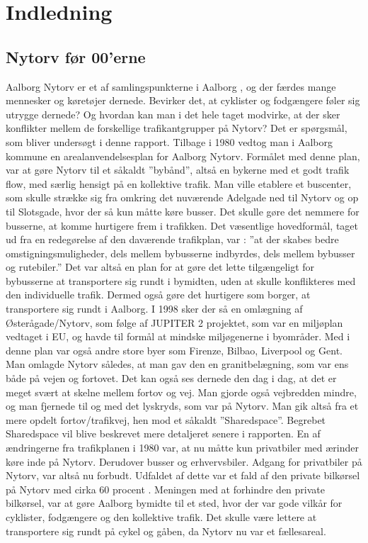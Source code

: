 \chapter{Indledning}
\label{chap:Indledning}

\section{Nytorv før 00'erne}
\label{sec:nytorv_foer_null}
Aalborg Nytorv er et af samlingspunkterne i Aalborg , og der færdes mange mennesker og køretøjer dernede. Bevirker det, at cyklister og fodgængere føler sig utrygge dernede? Og hvordan kan man i det hele taget modvirke, at der sker konflikter mellem de forskellige trafikantgrupper på Nytorv? Det er spørgsmål, som bliver undersøgt i denne rapport.
Tilbage i 1980 vedtog man i Aalborg kommune en arealanvendelsesplan for Aalborg Nytorv.
Formålet med denne plan, var at gøre Nytorv til et såkaldt ”bybånd”, altså en bykerne med et godt trafik flow, med særlig hensigt på en kollektive trafik. Man ville etablere et buscenter, som skulle strække sig fra omkring det nuværende Adelgade ned til Nytorv og op til Slotsgade, hvor der så kun måtte køre busser. Det skulle gøre det nemmere for busserne, at komme hurtigere frem i trafikken. Det  væsentlige hovedformål, taget ud fra en redegørelse af den daværende trafikplan, var :
”at der skabes bedre omstigningsmuligheder, dels mellem bybusserne     indbyrdes, dels mellem bybusser og rutebiler.”
Det var altså en plan for at gøre det lette tilgængeligt for bybusserne at transportere sig rundt i bymidten, uden at skulle konflikteres med den individuelle trafik. Dermed også gøre det hurtigere som borger, at transportere sig rundt i Aalborg.
I 1998 sker der så en omlægning af Østerågade/Nytorv, som følge af JUPITER 2 projektet, som var en miljøplan vedtaget i EU, og havde til formål at mindske miljøgenerne i byområder. Med i denne plan var også andre store byer som Firenze, Bilbao, Liverpool og Gent.
Man omlagde Nytorv således, at man gav den en granitbelægning, som var ens både på vejen og fortovet. Det kan også ses dernede den dag i dag, at det er meget svært at skelne mellem fortov og vej. Man gjorde også vejbredden mindre, og man fjernede til og med det lyskryds, som var på Nytorv. Man gik altså fra et mere opdelt fortov/trafikvej, hen mod et såkaldt ”Sharedspace”. Begrebet Sharedspace vil blive beskrevet mere detaljeret senere i rapporten. En af ændringerne fra trafikplanen i 1980 var, at nu måtte kun privatbiler med ærinder køre inde på Nytorv. Derudover busser og erhvervsbiler. Adgang for privatbiler på Nytorv, var altså nu forbudt. Udfaldet af dette var et fald af den private bilkørsel på Nytorv med cirka 60 procent . 
Meningen med at forhindre den private bilkørsel, var at gøre Aalborg bymidte til et sted, hvor der var gode vilkår for cyklister, fodgængere og den kollektive trafik. Det skulle være lettere at transportere sig rundt på cykel og gåben, da Nytorv nu var et fællesareal.

